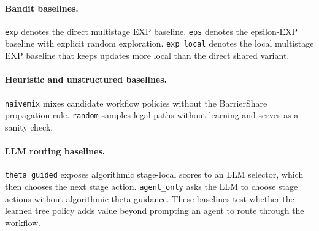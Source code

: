 \paragraph{Bandit baselines.}
\texttt{exp} denotes the direct multistage EXP baseline. \texttt{eps} denotes the epsilon-EXP baseline with explicit random exploration. \texttt{exp\_local} denotes the local multistage EXP baseline that keeps updates more local than the direct shared variant.

\paragraph{Heuristic and unstructured baselines.}
\texttt{naivemix} mixes candidate workflow policies without the BarrierShare propagation rule. \texttt{random} samples legal paths without learning and serves as a sanity check.

\paragraph{LLM routing baselines.}
\texttt{theta guided} exposes algorithmic stage-local scores to an LLM selector, which then chooses the next stage action. \texttt{agent\_only} asks the LLM to choose stage actions without algorithmic theta guidance. These baselines test whether the learned tree policy adds value beyond prompting an agent to route through the workflow.

